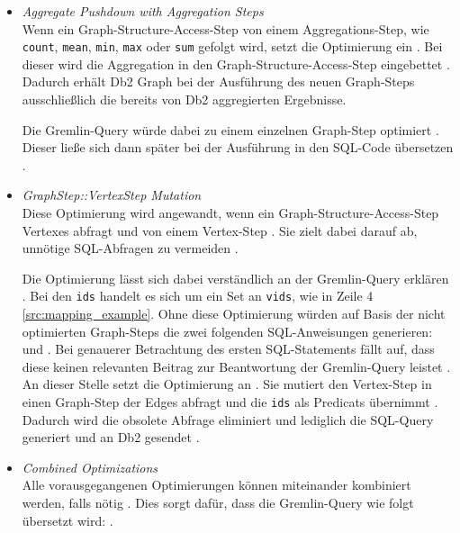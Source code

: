 \begin{itemize}
    \item \textit{Aggregate Pushdown with Aggregation Steps}\\
    Wenn ein Graph-Structure-Access-Step von einem Aggregations-Step, wie \texttt{count}, \texttt{mean}, \texttt{min}, \texttt{max} oder \texttt{sum} gefolgt wird, setzt die Optimierung ein \cite{sigmod_tian}. Bei dieser wird die Aggregation in den Graph-Structure-Access-Step eingebettet \cite{sigmod_tian}. Dadurch erhält Db2 Graph bei der Ausführung des neuen Graph-Steps ausschließlich die bereits von Db2 aggregierten Ergebnisse.
    
    Die Gremlin-Query  würde dabei zu einem einzelnen Graph-Step optimiert \cite{sigmod_tian}. Dieser ließe sich dann später bei der Ausführung in den SQL-Code  übersetzen \cite{sigmod_tian}.

    \item \textit{GraphStep::VertexStep Mutation}\\
    Diese Optimierung wird angewandt, wenn ein Graph-Structure-Access-Step Vertexes abfragt und von einem Vertex-Step \cite{sigmod_tian}. Sie zielt dabei darauf ab, unnötige SQL-Abfragen zu vermeiden \cite{sigmod_tian}. 

    Die Optimierung lässt sich dabei verständlich an der Gremlin-Query  erklären \cite{sigmod_tian}. Bei den \texttt{ids} handelt es sich um ein Set an \texttt{vids}, wie in Zeile 4 \autoref{src:mapping_example}. Ohne diese Optimierung würden auf Basis der nicht optimierten Graph-Steps die zwei folgenden SQL-Anweisungen generieren:  und  \cite{sigmod_tian}. Bei genauerer Betrachtung des ersten SQL-Statements fällt auf, dass diese keinen relevanten Beitrag zur Beantwortung der Gremlin-Query leistet \cite{sigmod_tian}. An dieser Stelle setzt die Optimierung an \cite{sigmod_tian}. Sie mutiert den Vertex-Step in einen Graph-Step der Edges abfragt und die \texttt{ids} als Predicats übernimmt \cite{sigmod_tian}. Dadurch wird die obsolete Abfrage eliminiert und lediglich die SQL-Query  generiert und an Db2 gesendet \cite{sigmod_tian}.

    \item \textit{Combined Optimizations}\\
    Alle vorausgegangenen Optimierungen können miteinander kombiniert werden, falls nötig \cite{sigmod_tian}. Dies sorgt dafür, dass die Gremlin-Query  wie folgt übersetzt wird: .
\end{itemize}

